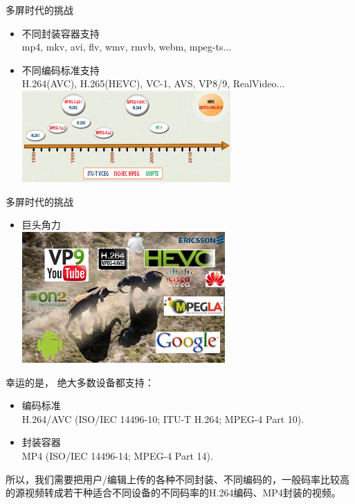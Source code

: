 \documentclass{beamer}
\begin{document}
\begin{frame}{多屏时代的挑战} 
\begin{itemize}
\item 不同封装容器支持\\ %
mp4, mkv, avi, flv, wmv, rmvb, webm, mpeg-ts... \pause
\item 不同编码标准支持\\ \pause
H.264(AVC), H.265(HEVC), VC-1, AVS, VP8/9, RealVideo...
\pause
\includegraphics[height=3.5cm]{fig/encoding_standards.png}\pause
\end{itemize}
\end{frame}
\begin{frame}{多屏时代的挑战} 
\begin{itemize}
\item 巨头角力\\ %
\includegraphics[height=5cm]{fig/competition.jpg}\pause
\end{itemize}
\end{frame}
\begin{frame}{幸运的是，}
\pause
绝大多数设备都支持：
\pause
\begin{itemize}
\item 编码标准\\ \pause
H.264/AVC (ISO/IEC 14496-10;  ITU-T H.264; MPEG-4 Part 10).
\item 封装容器\\ \pause
MP4 (ISO/IEC 14496-14; MPEG-4 Part 14).
\end{itemize}
\pause
所以，我们需要把用户/编辑上传的各种不同封装、不同编码的，一般码率比较高的源视频转成若干种适合不同设备的不同码率的H.264编码、MP4封装的视频。
\end{frame}
\end{document}
